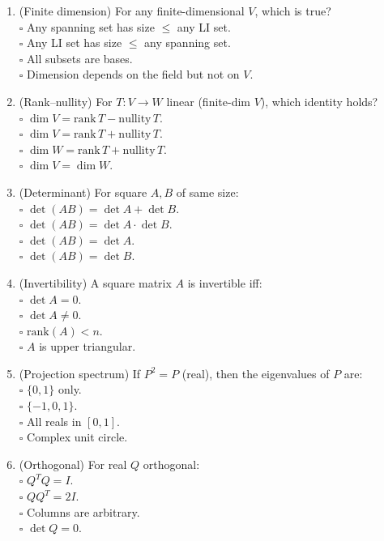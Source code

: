 \documentclass[11pt]{article}
\theoremstyle{upright}
\begin{document}
\begin{enumerate}
\item (Finite dimension) For any finite-dimensional $V$, which is true?\\
\(\square\) Any spanning set has size $\le$ any LI set.\\
\(\square\) Any LI set has size $\le$ any spanning set.\\
\(\square\) All subsets are bases.\\
\(\square\) Dimension depends on the field but not on $V$.

\item (Rank–nullity) For $T:V\to W$ linear (finite-dim $V$), which identity holds?\\
\(\square\) $\dim V=\mathrm{rank}\,T-\mathrm{nullity}\,T$.\\
\(\square\) $\dim V=\mathrm{rank}\,T+\mathrm{nullity}\,T$.\\
\(\square\) $\dim W=\mathrm{rank}\,T+\mathrm{nullity}\,T$.\\
\(\square\) $\dim V=\dim W$.

\item (Determinant) For square $A,B$ of same size:\\
\(\square\) $\det(AB)=\det A+\det B$.\\
\(\square\) $\det(AB)=\det A\cdot\det B$.\\
\(\square\) $\det(AB)=\det A$.\\
\(\square\) $\det(AB)=\det B$.

\item (Invertibility) A square matrix $A$ is invertible iff:\\
\(\square\) $\det A=0$.\\
\(\square\) $\det A\neq 0$.\\
\(\square\) $\mathrm{rank}(A)<n$.\\
\(\square\) $A$ is upper triangular.

\item (Projection spectrum) If $P^2=P$ (real), then the eigenvalues of $P$ are:\\
\(\square\) $\{0,1\}$ only.\\
\(\square\) $\{-1,0,1\}$.\\
\(\square\) All reals in $[0,1]$.\\
\(\square\) Complex unit circle.

\item (Orthogonal) For real $Q$ orthogonal:\\
\(\square\) $Q^TQ=I$.\\
\(\square\) $QQ^T=2I$.\\
\(\square\) Columns are arbitrary.\\
\(\square\) $\det Q=0$.


\end{enumerate}
\end{document}
